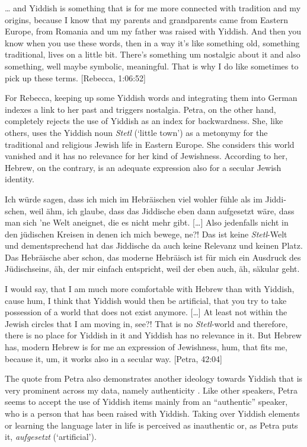 \documentclass[output=paper]{langscibook}
\begin{document}
… and Yiddish is something that is for me more connected with tradition and my origins, because I know that my parents and grandparents came from Eastern Europe, from Romania and um my father was raised with Yiddish. And then you know when you use these words, then in a way it’s like something old, something traditional, lives on a little bit. There’s something um nostalgic about it and also something, well maybe symbolic, meaningful. That is why I do like sometimes to pick up these terms. [Rebecca, 1:06:52]
\z

For Rebecca, keeping up some Yiddish words and integrating them into German indexes a link to her past and triggers nostalgia. Petra, on the other hand, completely rejects the use of Yiddish as an index for backwardness. She, like others, uses the Yiddish noun \textit{Stetl} (‘little town’) as a metonymy for the traditional and religious Jewish life in Eastern Europe. She considers this world vanished and it has no relevance for her kind of Jewishness. According to her, Hebrew, on the contrary, is an adequate expression also for a secular Jewish identity.

\eanoraggedright%
\label{ex:jahns:5}
\begin{otherlanguage}{ngerman}
Ich würde sagen, dass ich mich im Hebräischen viel wohler fühle als im Jiddischen, weil ähm, ich glaube, dass das Jiddische eben dann aufgesetzt wäre, dass man sich 'ne Welt aneignet, die es nicht mehr gibt. […] Also jedenfalls nicht in den jüdischen Kreisen in denen ich mich bewege, ne?! Das ist keine \textit{Stetl}-Welt und dementsprechend hat das Jiddische da auch keine Relevanz und keinen Platz. Das Hebräische aber schon, das moderne Hebräisch ist für mich ein Ausdruck des Jüdischseins, äh, der mir einfach entspricht, weil der eben auch, äh, säkular geht. 
\end{otherlanguage}

I would say, that I am much more comfortable with Hebrew than with Yiddish, cause hum, I think that Yiddish would then be artificial, that you try to take possession of a world that does not exist anymore. […] At least not within the Jewish circles that I am moving in, see?! That is no \textit{Stetl}{}-world and therefore, there is no place for Yiddish in it and Yiddish has no relevance in it. But Hebrew has, modern Hebrew is for me an expression of Jewishness, hum, that fits me, because it, um, it works also in a secular way. [Petra, 42:04]
\z

The quote from Petra also demonstrates another ideology towards Yiddish that is very prominent across my data, namely authenticity \citep[167--174]{JahnsToAppear}. Like other speakers, Petra seems to accept the use of Yiddish items mainly from an “authentic” speaker, who is a person that has been raised with Yiddish. Taking over Yiddish elements or learning the language later in life is perceived as inauthentic or, as Petra puts it, \textit{aufgesetzt} (‘artificial’).
\end{document}
